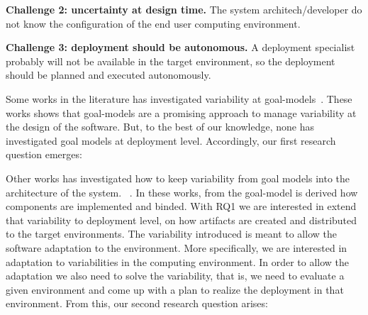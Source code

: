 \textbf{ Challenge 2: uncertainty at design time.} The system architech/developer do not know the configuration of the end user computing environment.

\textbf{ Challenge 3: deployment should be autonomous.} A deployment specialist probably will not be available in the target environment, so the deployment should be planned and executed autonomously.




Some works in the literature has investigated variability at goal-models~\cite{yu_goals_2008}\cite{ali_requirements-driven_2014}\cite{angelopoulos_capturing_2015}. These works shows that goal-models are a promising approach to manage variability at the design of the software. But, to the best of our knowledge, none has investigated goal models at deployment level.
Accordingly, our first research question emerges:

 \setlength{\fboxsep}{10pt}
 \noindent{}\bigskip


Other works has investigated how to keep variability from goal models into the architecture of the system. ~\cite{yu_goals_2008}\cite{angelopoulos_capturing_2015}. In these works, from the goal-model is derived how components are implemented and binded. With RQ1 we are interested in extend that variability to deployment level, on how artifacts are created and distributed to the target environments. The variability introduced is meant to allow the software adaptation to the environment. More specifically, we are interested in adaptation to variabilities in the computing environment. In order to allow the adaptation we also need to solve the variability, that is, we need to evaluate a given environment and come up with a plan to realize the deployment in that environment. From this, our second research question arises:

\setlength{\fboxsep}{10pt}
\noindent{}\bigskip


